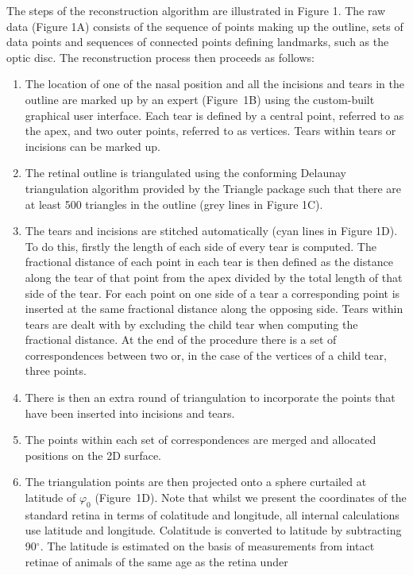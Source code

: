 \documentclass[10pt]{article}
\newcounter{Figure}
\begin{document}
The steps of the reconstruction algorithm are illustrated in Figure 1.
The raw data (Figure 1A) consists of the sequence of points making up
the outline, sets of data points and sequences of connected points
defining landmarks, such as the optic disc. The reconstruction
process then proceeds as follows: 

\begin{enumerate}
\item The location of one of the nasal position and all the incisions
and tears in the outline are marked up by an expert (Figure~1B) using
the custom-built graphical user interface. Each tear is defined by a
central point, referred to as the apex, and two outer points,
referred to as vertices. Tears within tears or incisions can be
marked up. 
\item The retinal outline is triangulated using the conforming
Delaunay triangulation algorithm provided by the Triangle package \cite{Shewchuk1996} such that there are at least 500 triangles in the
outline (grey lines in Figure 1C). 
\item The tears and incisions are stitched automatically (cyan lines
in Figure 1D). To do this, firstly the length of each side of every
tear is computed. The fractional distance of each point in each tear
is then defined as the distance along the tear of that point from the
apex divided by the total length of that side of the tear. For each
point on one side of a tear a corresponding point is inserted at the
same fractional distance along the opposing side. Tears within tears
are dealt with by excluding the child tear when computing the
fractional distance. At the end of the procedure there is a set of
correspondences between two or, in the case of the vertices of a
child tear, three points. 
\item There is then an extra round of triangulation to incorporate the
points that have been inserted into incisions and tears. 
\item The points within each set of correspondences are merged and
allocated positions on the 2D surface. 
\item The triangulation points are then projected onto a sphere
curtailed at latitude of  $\varphi _0$ (Figure~1D). Note that whilst
we present the coordinates of the standard retina in terms of
colatitude and longitude, all internal calculations use latitude and
longitude. Colatitude is converted to latitude by subtracting
90$^{\circ}$. The latitude is estimated on the basis of measurements from
intact retinae of animals of the same age as the retina under

\end{enumerate}
\end{document}
